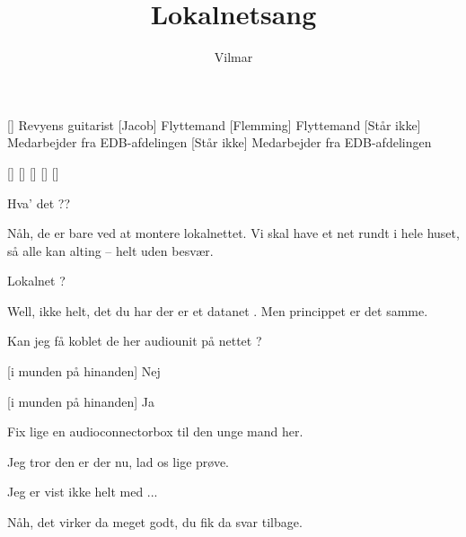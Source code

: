 \documentclass[a4paper,11pt]{article}
\title{Lokalnetsang}
\author{Vilmar}
\begin{document}
\maketitle

\begin{roles}
[] Revyens guitarist
[Jacob] Flyttemand
[Flemming] Flyttemand
[Står ikke] Medarbejder fra EDB-afdelingen
[Står ikke] Medarbejder fra EDB-afdelingen
\end{roles}

\begin{props}
[]
[]
[]
[]
[]
\end{props}

\begin{sketch}

  Hva' det ??

 Nåh, de er bare ved at montere lokalnettet.  Vi skal have et net rundt
i hele huset, så alle kan alting -- helt uden besvær.

 Lokalnet ? 

 Well, ikke helt, det du har der er et datanet .  Men princippet er det samme.

  Kan jeg få
koblet de her audiounit på nettet ?

[i munden på hinanden] Nej

[i munden på hinanden] Ja

  Fix lige en audioconnectorbox til den unge mand
her. 

 Jeg tror den er der nu, lad os lige prøve. 

 Jeg er vist ikke helt med ...

 Nåh, det virker da meget godt, du fik da svar tilbage.


\end{sketch}
\end{document}
